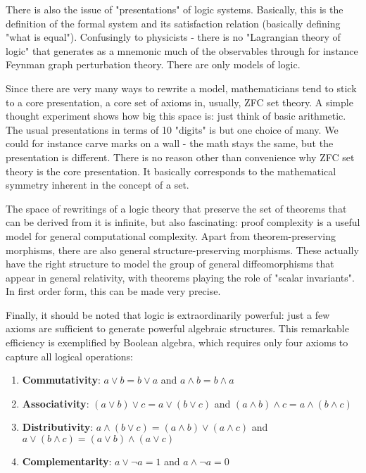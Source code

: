 There is also the issue of "presentations" of logic systems. Basically, this is the definition of the formal system and its satisfaction relation (basically defining "what is equal"). Confusingly to physicists - there is no "Lagrangian theory of logic" that generates as a mnemonic much of the observables through for instance Feynman graph perturbation theory. There are only models of logic. 

Since there are very many ways to rewrite a model, mathematicians tend to stick to a core presentation, a core set of axioms in, usually, ZFC set theory. A simple thought experiment shows how big this space is: just think of basic arithmetic. The usual presentations in terms of 10 "digits" is but one choice of many. We could for instance carve marks on a wall - the math stays the same, but the presentation is different. There is no reason other than convenience why ZFC set theory is the core presentation. It basically corresponds to the mathematical symmetry inherent in the concept of a set.


The space of rewritings of a logic theory that preserve the set of theorems that can be derived from it is infinite, but also fascinating: proof complexity is a useful model for general computational complexity. Apart from theorem-preserving morphisms, there are also general structure-preserving morphisms. These actually have the right structure to model the group of general diffeomorphisms that appear in general relativity, with theorems playing the role of "scalar invariants". In first order form, this can be made very precise. 

Finally, it should be noted that logic is extraordinarily powerful: just a few axioms are sufficient to generate powerful algebraic structures. This remarkable efficiency is exemplified by Boolean algebra, which requires only four axioms to capture all logical operations:

\begin{enumerate}
\item \textbf{Commutativity}: $a \vee b = b \vee a$ and $a \wedge b = b \wedge a$
\item \textbf{Associativity}: $(a \vee b) \vee c = a \vee (b \vee c)$ and $(a \wedge b) \wedge c = a \wedge (b \wedge c)$
\item \textbf{Distributivity}: $a \wedge (b \vee c) = (a \wedge b) \vee (a \wedge c)$ and $a \vee (b \wedge c) = (a \vee b) \wedge (a \vee c)$
\item \textbf{Complementarity}: $a \vee \neg a = 1$ and $a \wedge \neg a = 0$
\end{enumerate}

